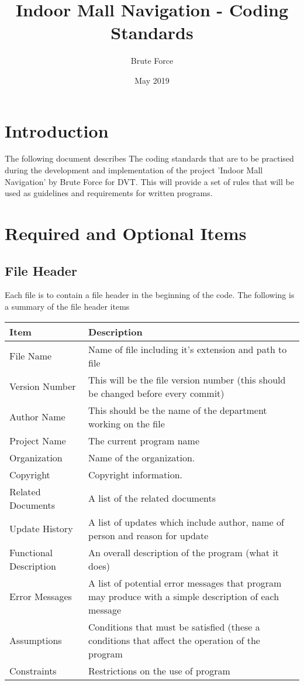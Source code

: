 \documentclass{article}
\title{Indoor Mall Navigation - Coding Standards}
\author{Brute Force }
\date{May 2019}
\begin{document}
\maketitle

\pagebreak
\tableofcontents
\pagebreak

\section{Introduction}

The following document describes The coding standards that are to be practised during the development and implementation of the project 'Indoor Mall Navigation' by Brute Force for DVT.
\newline
\newline
This will provide a set of rules that will be used as guidelines and requirements for written programs.

\section{Required and Optional Items}
\subsection{File Header}
Each file is to contain a file header in the beginning of the code. The following is a summary of the file header items
\cite{kung}
\begin{center}
        \begin{tabular}{|>{\centering}p{3.5cm}|p{10cm}|}
             \hline
              \textbf{Item} & \textbf{Description}  \tabularnewline
             \hline
             File Name & Name of file including it's extension and path to file\tabularnewline
             \hline
              Version Number & This will be the file version number (this should be changed before every commit)\tabularnewline
              \hline
             Author Name & This should be the name of the department working on the file\tabularnewline 
             \hline
             Project Name & The current program name\tabularnewline
             \hline
             Organization & Name of the organization.\tabularnewline
             \hline
             Copyright & Copyright information.\tabularnewline
             \hline
             Related Documents & A list of the related documents\tabularnewline
             \hline
             Update History & A list of updates which include author, name of person and reason for update\tabularnewline
             \hline
             Functional Description & An overall description of the program (what it does)\tabularnewline
             \hline
             Error Messages & A list of potential error messages that program may produce with a simple description of each message\tabularnewline
             \hline
             Assumptions & Conditions that must be satisfied (these a conditions that affect the operation of the program\tabularnewline
             \hline
             Constraints & Restrictions on the use of program\tabularnewline
             \hline
        \end{tabular}
    \end{center}
\pagebreak
\end{document}
